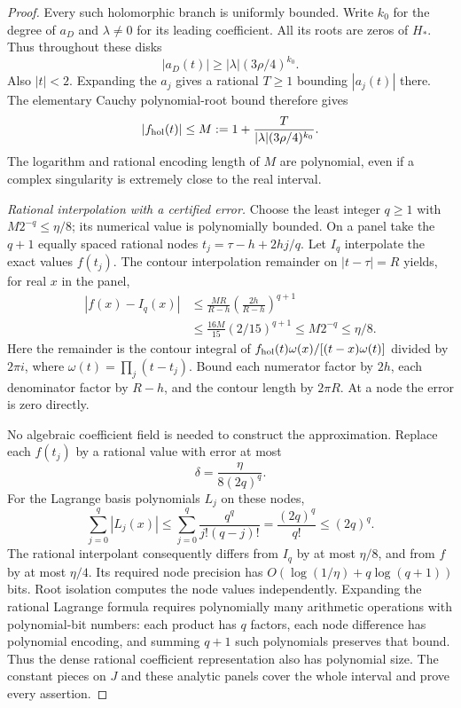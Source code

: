 \begin{proof}
Every such holomorphic branch is uniformly bounded. Write $k_0$ for
the degree of $a_D$ and $\lambda\ne0$ for its leading coefficient. All
its roots are zeros of $H_*$. Thus throughout these disks
\[
 |a_D(t)|\ge |\lambda|(3\rho/4)^{k_0}.
\]
Also $|t|<2$. Expanding the $a_j$ gives a rational $T\ge1$ bounding
$|a_j(t)|$ there. The elementary Cauchy polynomial-root bound therefore
gives
\begin{equation}
 |f_{\rm hol}(t)|\le
 M:=1+\frac{T}{|\lambda|(3\rho/4)^{k_0}}.
 \label{eq:a-wblk-complex-bound}
\end{equation}
The logarithm and rational encoding length of $M$ are polynomial, even
if a complex singularity is extremely close to the real interval.

\emph{Rational interpolation with a certified error.}
Choose the least integer $q\ge1$ with $M2^{-q}\le\eta/8$; its numerical
value is polynomially bounded. On a panel take the $q+1$ equally spaced rational nodes
$t_j=\tau-h+2hj/q$. Let $I_q$ interpolate the exact values $f(t_j)$.
The contour interpolation remainder on $|t-\tau|=R$ yields, for real
$x$ in the panel,
\begin{align*}
 |f(x)-I_q(x)|
 &\le\frac{MR}{R-h}
       \left(\frac{2h}{R-h}\right)^{q+1}\\
 &\le\frac{16M}{15}(2/15)^{q+1}
 \le M2^{-q}\le\eta/8.
\end{align*}
Here the remainder is the contour integral of
$f_{\rm hol}(t)\omega(x)/[(t-x)\omega(t)]$ divided by $2\pi i$, where
$\omega(t)=\prod_j(t-t_j)$. Bound each numerator factor by $2h$, each
denominator factor by $R-h$, and the contour length by $2\pi R$.
At a node the error is zero directly.

No algebraic coefficient field is needed to construct the approximation.
Replace each $f(t_j)$ by a rational value with error at most
\[
 \delta=\frac{\eta}{8(2q)^q}.
\]
For the Lagrange basis polynomials $L_j$ on these nodes,
\[
 \sum_{j=0}^q |L_j(x)|
 \le\sum_{j=0}^q\frac{q^q}{j!(q-j)!}
 =\frac{(2q)^q}{q!}\le(2q)^q.
\]
The rational interpolant consequently differs from $I_q$ by at most
$\eta/8$, and from $f$ by at most $\eta/4$. Its required node precision
has $O(\log(1/\eta)+q\log(q+1))$ bits. Root isolation computes the node
values independently. Expanding the rational Lagrange formula requires
polynomially many arithmetic operations with polynomial-bit numbers:
each product has $q$ factors, each node difference has polynomial
encoding, and summing $q+1$ such polynomials preserves that bound.
Thus the dense rational coefficient representation also has polynomial
size. The constant pieces on $J$ and these analytic panels cover the
whole interval and prove every assertion.
\end{proof}

